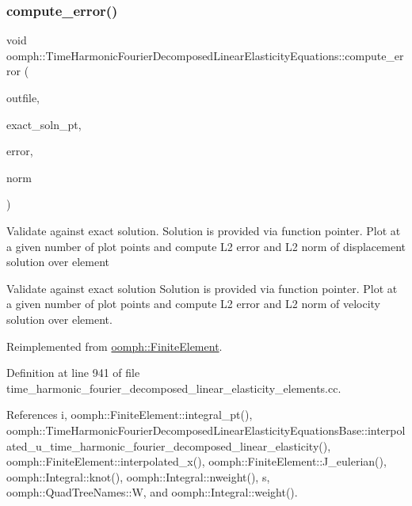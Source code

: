 \subsubsection{\texorpdfstring{compute\+\_\+error()}{compute\_error()}}
{\footnotesize\ttfamily void oomph\+::\+Time\+Harmonic\+Fourier\+Decomposed\+Linear\+Elasticity\+Equations\+::compute\+\_\+error (\begin{DoxyParamCaption}\item[{std\+::ostream \&}]{outfile,  }\item[{\hyperlink{classoomph_1_1FiniteElement_a690fd33af26cc3e84f39bba6d5a85202}{Finite\+Element\+::\+Steady\+Exact\+Solution\+Fct\+Pt}}]{exact\+\_\+soln\+\_\+pt,  }\item[{double \&}]{error,  }\item[{double \&}]{norm }\end{DoxyParamCaption})\hspace{0.3cm}{\ttfamily [virtual]}}

Validate against exact solution. Solution is provided via function pointer. Plot at a given number of plot points and compute L2 error and L2 norm of displacement solution over element

Validate against exact solution Solution is provided via function pointer. Plot at a given number of plot points and compute L2 error and L2 norm of velocity solution over element. 

Reimplemented from \hyperlink{classoomph_1_1FiniteElement_a73c79a1f1e5b1d334757812a6bbd58ff}{oomph\+::\+Finite\+Element}.



Definition at line 941 of file time\+\_\+harmonic\+\_\+fourier\+\_\+decomposed\+\_\+linear\+\_\+elasticity\+\_\+elements.\+cc.



References i, oomph\+::\+Finite\+Element\+::integral\+\_\+pt(), oomph\+::\+Time\+Harmonic\+Fourier\+Decomposed\+Linear\+Elasticity\+Equations\+Base\+::interpolated\+\_\+u\+\_\+time\+\_\+harmonic\+\_\+fourier\+\_\+decomposed\+\_\+linear\+\_\+elasticity(), oomph\+::\+Finite\+Element\+::interpolated\+\_\+x(), oomph\+::\+Finite\+Element\+::\+J\+\_\+eulerian(), oomph\+::\+Integral\+::knot(), oomph\+::\+Integral\+::nweight(), s, oomph\+::\+Quad\+Tree\+Names\+::W, and oomph\+::\+Integral\+::weight().

\mbox{\label{classoomph_1_1TimeHarmonicFourierDecomposedLinearElasticityEquations_a5dc79c23b17db6bf138f757859e2b53e}} 
